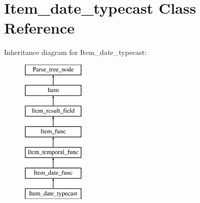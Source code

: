 \hypertarget{classItem__date__typecast}{}\section{Item\+\_\+date\+\_\+typecast Class Reference}
\label{classItem__date__typecast}
Inheritance diagram for Item\+\_\+date\+\_\+typecast\+:\begin{figure}[H]
\begin{center}
\leavevmode
\includegraphics[height=7.000000cm]{classItem__date__typecast}
\end{center}
\end{figure}
